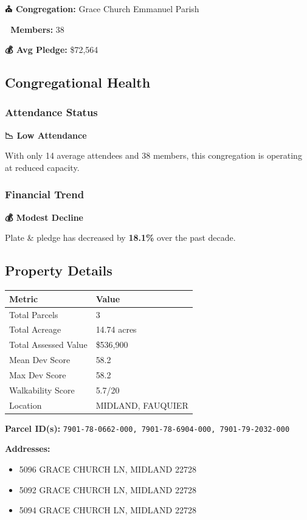 \documentclass[
  letterpaper,
  DIV=11,
  numbers=noendperiod,
  oneside]{scrreprt}
\providecommand{\tightlist}{%
  \setlength{\itemsep}{0pt}\setlength{\parskip}{0pt}}
\begin{document}
\textbf{⛪ Congregation:} Grace Church Emmanuel Parish

\textbf{👥 Members:} 38

\textbf{💰 Avg Pledge:} \$72,564

\subsection{Congregational Health}

\subsubsection{Attendance Status}\label{attendance-status-5}

\textbf{📉 Low Attendance}

With only 14 average attendees and 38 members, this congregation is
operating at reduced capacity.

\subsubsection{Financial Trend}\label{financial-trend-5}

\textbf{💰 Modest Decline}

Plate \& pledge has decreased by \textbf{18.1\%} over the past decade.

\subsection{Property Details}

\begin{longtable}[]{@{}ll@{}}
\toprule\noalign{}
Metric & Value \\
\midrule\noalign{}
\endhead
\bottomrule\noalign{}
\endlastfoot
Total Parcels & 3 \\
Total Acreage & 14.74 acres \\
Total Assessed Value & \$536,900 \\
Mean Dev Score & 58.2 \\
Max Dev Score & 58.2 \\
Walkability Score & 5.7/20 \\
Location & MIDLAND, FAUQUIER \\
\end{longtable}

\textbf{Parcel ID(s):}
\texttt{7901-78-0662-000,\ 7901-78-6904-000,\ 7901-79-2032-000}

\textbf{Addresses:}

\begin{itemize}
\tightlist
\item
  5096 GRACE CHURCH LN, MIDLAND 22728
\item
  5092 GRACE CHURCH LN, MIDLAND 22728
\item
  5094 GRACE CHURCH LN, MIDLAND 22728
\end{itemize}
\end{document}
